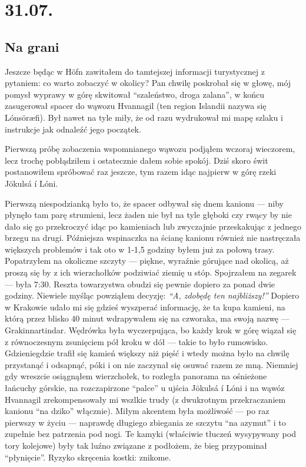 \chapter*{31.07.}

\section*{Na grani}

Jeszcze będąc w Höfn zawitałem do tamtejszej informacji turystycznej z pytaniem: co warto zobaczyć w okolicy? Pan chwilę poskrobał się w głowę, mój pomysł wyprawy w górę  skwitował “szaleństwo, droga zalana”, w końcu zasugerował spacer do wąwozu Hvannagil (ten region Islandii nazywa się Lónsöræfi). Był nawet na tyle miły, że od razu wydrukował mi mapę szlaku i instrukcje jak odnaleźć jego początek.

Pierwszą próbę zobaczenia wspomnianego wąwozu podjąłem wczoraj wieczorem, lecz trochę pobłądziłem i ostatecznie dałem sobie spokój. Dziś skoro świt postanowiłem spróbować raz jeszcze, tym razem idąc najpierw w górę rzeki Jökulsá í Lóni.

Pierwszą niespodzianką było to, że spacer odbywał się dnem kanionu --- niby płynęło tam parę strumieni, lecz żaden nie był na tyle głęboki czy rwący by nie dało się go przekroczyć idąc po kamieniach lub zwyczajnie przeskakując z jednego brzegu na drugi. Późniejsza wspinaczka na ścianę kanionu również nie nastręczała większych problemów i tak oto w 1-1,5 godziny byłem już za połową trasy. Popatrzyłem na okoliczne szczyty --- piękne, wyraźnie górujące nad okolicą, aż proszą się by z ich wierzchołków podziwiać ziemię u stóp. Spojrzałem na zegarek --- była 7:30. Reszta towarzystwa obudzi się pewnie dopiero za ponad dwie godziny. Niewiele myśląc powziąłem decyzję: \emph{“A, zdobędę ten najbliższy!”} Dopiero w Krakowie udało mi się gdzieś wyszperać informację, że ta kupa kamieni, na którą przez blisko 40 minut wdrapywałem się na czworaka, ma swoją nazwę --- Grakinnartindar. Wędrówka była wyczerpująca, bo każdy krok w górę wiązał się z równoczesnym zsunięciem pół kroku w dół --- takie to było rumowisko. Gdzieniegdzie trafił się kamień większy niż pięść i wtedy można było na chwilę przystanąć i odsapnąć, póki i on nie zaczynał się osuwać razem ze mną. Niemniej gdy wreszcie osiągnąłem wierzchołek, to rozległa panorama na ośnieżone łańcuchy górskie, na rozczapirzone “palce” u ujścia Jökulsá í Lóni i na wąwóz Hvannagil zrekompensowały mi wszlkie trudy (z dwukrotnym przekraczaniem kanionu “na dziko” włącznie). Miłym akcentem była możliwość --- po raz pierwszy w życiu --- naprawdę długiego zbiegania ze szczytu “na azymut” i to zupełnie bez patrzenia pod nogi. Te kamyki (właściwie tłuczeń wysypywany pod tory kolejowe) były tak luźno związane z podłożem, że bieg przypominał “płynięcie”. Ryzyko skręcenia kostki: znikome.

